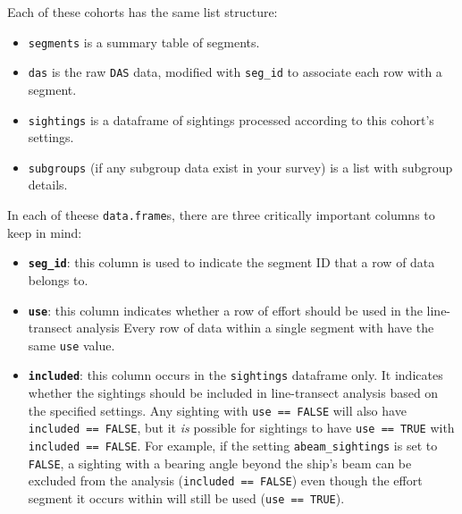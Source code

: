 \documentclass[
]{book}
\newenvironment{Shaded}{\begin{snugshade}}{\end{snugshade}}
\newcommand{\DecValTok}[1]{\textcolor[rgb]{0.00,0.00,0.81}{#1}}
\newcommand{\NormalTok}[1]{#1}
\newcommand{\OperatorTok}[1]{\textcolor[rgb]{0.81,0.36,0.00}{\textbf{#1}}}
\newcommand{\StringTok}[1]{\textcolor[rgb]{0.31,0.60,0.02}{#1}}
\begin{document}
Each of these cohorts has the same list structure:

\begin{Shaded}
\end{Shaded}

\begin{itemize}
\item
  \texttt{segments} is a summary table of segments.
\item
  \texttt{das} is the raw \texttt{DAS} data, modified with \texttt{seg\_id} to associate each row with a segment.
\item
  \texttt{sightings} is a dataframe of sightings processed according to this cohort's settings.
\item
  \texttt{subgroups} (if any subgroup data exist in your survey) is a list with subgroup details.
\end{itemize}

In each of theese \texttt{data.frame}s, there are three critically important columns to keep in mind:

\begin{itemize}
\item
  \textbf{\texttt{seg\_id}}: this column is used to indicate the segment ID that a row of data belongs to.
\item
  \textbf{\texttt{use}}: this column indicates whether a row of effort should be used in the line-transect analysis Every row of data within a single segment with have the same \texttt{use} value.
\item
  \textbf{\texttt{included}}: this column occurs in the \texttt{sightings} dataframe only. It indicates whether the sightings should be included in line-transect analysis based on the specified settings. Any sighting with \texttt{use\ ==\ FALSE} will also have \texttt{included\ ==\ FALSE}, but it \emph{is} possible for sightings to have \texttt{use\ ==\ TRUE} with \texttt{included\ ==\ FALSE}. For example, if the setting \texttt{abeam\_sightings} is set to \texttt{FALSE}, a sighting with a bearing angle beyond the ship's beam can be excluded from the analysis (\texttt{included\ ==\ FALSE}) even though the effort segment it occurs within will still be used (\texttt{use\ ==\ TRUE}).
\end{itemize}
\end{document}
